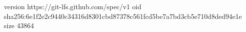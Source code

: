 version https://git-lfs.github.com/spec/v1
oid sha256:6e1f2e2c9440c34316d8301cbd87378c561fcd5be7a7bd3cb5e710d8ded94e1e
size 43864
